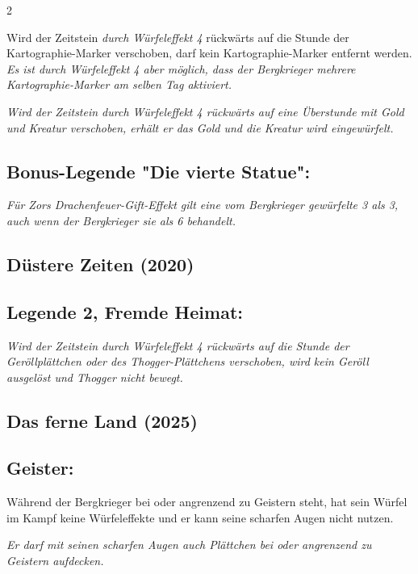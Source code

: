\documentclass[10pt, a4paper, oneside]{book}
\newcommand{\fan}[1]{\textit{#1}}
\begin{document}
\begin{multicols*}{2}
\begin{bgcolor}[color-ag]
Wird der Zeitstein \fan{durch Würfeleffekt 4} rückwärts auf die Stunde der Kartographie-Marker verschoben, darf kein Kartographie-Marker entfernt werden. 
\supercite{ag-begleitheft}
\fan{Es ist durch Würfeleffekt 4 aber möglich, dass der Bergkrieger mehrere Kartographie-Marker am selben Tag aktiviert.}

\fan{Wird der Zeitstein durch Würfeleffekt 4 rückwärts auf eine Überstunde mit Gold und Kreatur verschoben, erhält er das Gold und die Kreatur wird eingewürfelt.}


\subsection{Bonus-Legende "Die vierte Statue":}

\fan{Für Zors Drachenfeuer-Gift-Effekt gilt eine vom Bergkrieger gewürfelte 3 als 3, auch wenn der Bergkrieger sie als 6 behandelt.}

\end{bgcolor}




\columnbreak




\begin{bgcolor}[color-dz]
\section{Düstere Zeiten (2020)}

\subsection{Legende 2, Fremde Heimat:}

\fan{Wird der Zeitstein durch Würfeleffekt 4 rückwärts auf die Stunde der Geröllplättchen oder des Thogger-Plättchens verschoben, wird kein Geröll ausgelöst und Thogger nicht bewegt.}

\end{bgcolor}



\begin{bgcolor}
\section{Das ferne Land (2025)}




\subsection{Geister:}

Während der Bergkrieger bei oder angrenzend zu Geistern steht, hat sein Würfel im Kampf keine Würfeleffekte und er kann seine scharfen Augen nicht nutzen.

\fan{Er darf mit seinen scharfen Augen auch Plättchen bei oder angrenzend zu Geistern aufdecken.}

\end{bgcolor}




\end{multicols*}
\end{document}
